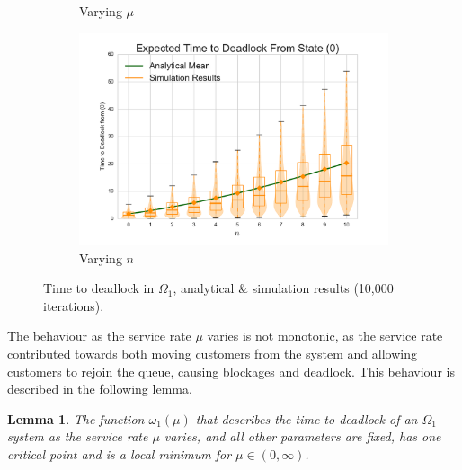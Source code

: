 \documentclass{article}
\newtheorem{lemma}{Lemma}
\begin{document}
\begin{figure}[!htbp]
\begin{subfigure}[b]{0.5\textwidth}
  \caption{Varying $\mu$}
  \label{fig:timestodeadlock_mu}
\end{subfigure}
\begin{subfigure}[b]{0.5\textwidth}
  \includegraphics[width=\textwidth]{images/varyn}
  \caption{Varying $n$}
  \label{fig:timestodeadlock_n}
\end{subfigure}
\caption{Time to deadlock in $\Omega_1$, analytical \& simulation results (10,000 iterations).}
\label{fig:timestodeadlock}
\end{figure}

The behaviour as the service rate $\mu$ varies is not monotonic, as the service rate contributed towards both moving customers from the system and allowing customers to rejoin the queue, causing blockages and deadlock.
This behaviour is described in the following lemma.\\

\begin{lemma}\label{lem:oneminima}
The function $\omega_1(\mu)$ that describes the time to deadlock of an $\Omega_1$ system as the service rate $\mu$ varies, and all other parameters are fixed, has one critical point and is a local minimum for $\mu \in (0, \infty)$.
\end{lemma}
\end{document}
